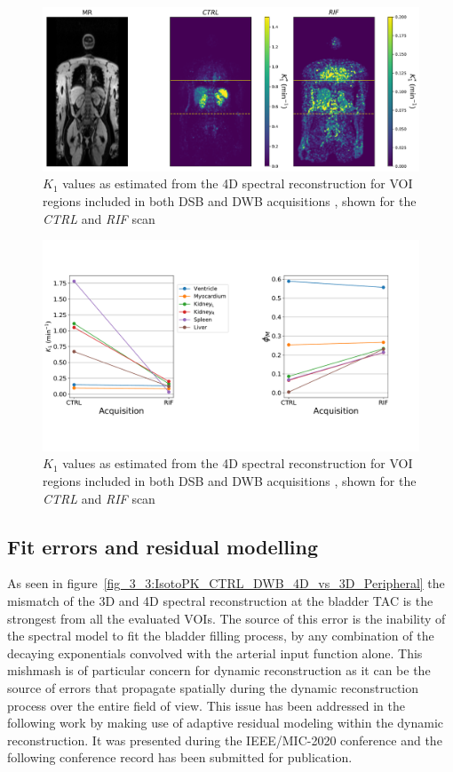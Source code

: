 \begin{figure} [h!]
\centering
\includegraphics[scale=0.5,angle=0]{3_Results/3_3_DWB_Reconstruction/figures/3_3_IsotoPK_K1_SingleSlice.pdf}
\caption{$K_1$ values as estimated from the 4D spectral reconstruction for VOI regions included in both DSB and DWB acquisitions , shown for the \textit{CTRL} and \textit{RIF} scan}
\label{fig_3_3:IsotoPK_K1_SingleSlice}
\end{figure} 

\begin{figure} [h!]
\centering
\includegraphics[scale=0.5,angle=0]{3_Results/3_3_DWB_Reconstruction/figures/K1_VB_drop.pdf}
\caption{$K_1$ values as estimated from the 4D spectral reconstruction for VOI regions included in both DSB and DWB acquisitions , shown for the \textit{CTRL} and \textit{RIF} scan}
\label{fig_3_3:IsotoPK_K1_drop}
\end{figure} 

\subsection{Fit errors and residual modelling}
\label{sub_section:residuals}
As seen in figure~\ref{fig_3_3:IsotoPK_CTRL_DWB_4D_vs_3D_Peripheral} the mismatch of the 3D and 4D spectral reconstruction at the bladder TAC is the strongest from all the evaluated VOIs. The source of this error is the inability of the spectral model to fit the bladder filling process, by any combination of the decaying exponentials convolved with the arterial input function alone. This mishmash is of particular concern for dynamic reconstruction as it can be the source of errors that propagate spatially during the dynamic reconstruction process over the entire field of view. 
This issue has been addressed in the following work by making use of adaptive residual modeling within the dynamic reconstruction. It was presented during the IEEE/MIC-2020 conference and the following conference record has been submitted for publication. 

